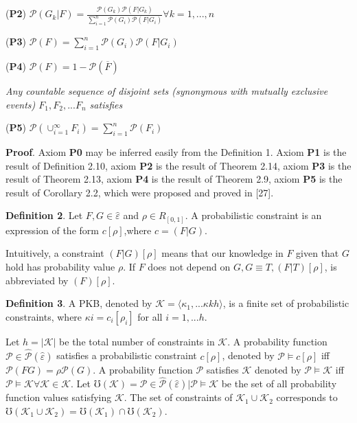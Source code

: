 \documentclass[]{iosart2c}
\begin{document}
(\textbf{P2}) $\mathcal{P}(G_k|F) = \frac{\mathcal{P}(G_k)\mathcal{P}(F|G_k)}{\sum_{i=1}^{n} \mathcal{P}(G_i)\mathcal{P}(F|G_i)} \forall k = 1, ..., n$

(\textbf{P3}) $\mathcal{P}(F) = \sum_{i=1}^{n} {\mathcal{P}(G_i)\mathcal{P}(F|G_i)}$

(\textbf{P4}) $\mathcal{P}(F) = 1 - \mathcal{P}(\overline F)$

\textit{Any countable sequence of disjoint sets (synonymous with mutually exclusive events) $F_1, F_2, ... F_n$ satisfies}

(\textbf{P5}) $\mathcal{P}(\cup_{i=1}^\infty F_i) = \sum_{i=1}^n \mathcal{P}(F_i)$

\textbf{Proof}. Axiom \textbf{P0} may be inferred easily from the Definition 1. Axiom \textbf{P1} is the result of Definition 2.10, axiom \textbf{P2} is the result of Theorem 2.14, axiom \textbf{P3} is the result of Theorem 2.13, axiom \textbf{P4} is the result of Theorem 2.9, axiom \textbf{P5} is the result of Corollary 2.2, which were proposed and proved in [27].

\textbf{Definition 2}. Let $F,G \in \hat{\varepsilon}$ and $\rho \in R_{[0,1]}$. A probabilistic constraint is an expression of the form $c[\rho]$,where $c = (F|G)$.

Intuitively, a constraint $(F|G)[\rho]$ means that our knowledge in $F$ given that $G$  hold has probability value $\rho$. If $F$ does not depend on $G,G \equiv T, (F|T)[\rho]$, is abbreviated by $(F)[\rho]$.

\textbf{Definition 3}. A PKB, denoted by $\mathcal{K} = \langle \kappa_1, ... \kappa kh \rangle$, is a finite set of probabilistic constraints, where $\kappa i = c_i[\rho_i]$ for all $i = 1, ... h$. 

Let $h = |\mathcal{K}|$ be the total number of constraints in $\mathcal{K}$. A probability function $\mathcal{P} \in \hat{\mathcal{P}} (\hat{\varepsilon})$ satisfies a probabilistic constraint $c[\rho]$, denoted by $\mathcal{P} \models c[\rho]$ iff $\mathcal{P}(FG) = \rho\mathcal{P}(G)$. A probability function $\mathcal{P}$ satisfies $\mathcal{K}$ denoted by $\mathcal{P} \models \mathcal{K}$ iff $\mathcal{P} \models \mathcal{K}\forall \mathcal{K} \in \mathcal{K}$. Let $\mho (\mathcal{K}) = {\mathcal{P} \in \hat{\mathcal{P}} (\hat{\varepsilon})|\mathcal{P} \models \mathcal{K}}$ be the set of all probability function values satisfying $\mathcal{K}$. The set of constraints of $\mathcal{K}_1 \cup \mathcal{K}_2$ corresponds to $\mho(\mathcal{K}_1 \cup \mathcal{K}_2) = \mho(\mathcal{K}_1) \cap \mho (\mathcal{K}_2)$.
\end{document}
